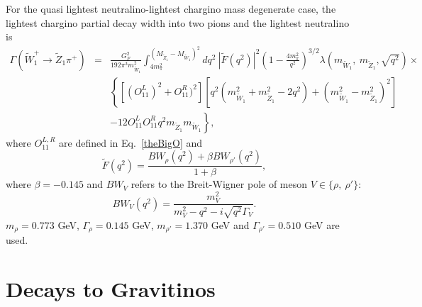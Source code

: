 \documentclass[final,3p,times]{elsarticle}
\begin{document}
For the quasi lightest neutralino-lightest chargino mass degenerate case, 
the lightest chargino partial decay width into two pions and the lightest
neutralino 
is~\cite{gunionetal} 
\begin{eqnarray}
\Gamma( {\tilde W}_1^+ \rightarrow {\tilde Z}_1 \pi^+) &=& 
\frac{G_F^2}{192 \pi^3 m_{{\tilde W}_1}^2} \int_{4 m_\pi^2}^{(M_{\tilde{Z}_1}-M_{\tilde{W}_1})^2}
dq^2\ \left| \tilde{F}(q^2)\right|^2 \left(1 - \frac{4 m_\pi^2}{q^2} \right)^{3/2}
\lambda\left(m_{\tilde{W}_1},\ m_{\tilde{Z}_1}, \sqrt{q^2}\right) \times \nonumber \\&&
\left\{ \left[ (O^L_{11})^2 +O^R_{11})^2\right] 
\left[ q^2(m_{{\tilde W}_1}^2 + m_{{\tilde Z}_1}^2-2q^2) +
(m_{{\tilde W}_1}^2 - m_{{\tilde Z}_1}^2)^2 \right] \right. \nonumber \\
&&\left. -12 O^L_{11} O^R_{11} q^2 m_{\tilde{Z}_1}m_{\tilde{W}_1}
\right\}, \label{chpipineut}
\end{eqnarray}
where $O^{L,R}_{11}$ are defined in Eq.~\ref{theBigO} and
\begin{equation}
\tilde{F}(q^2)=\frac{BW_\rho(q^2) + \beta BW_{\rho'}(q^2)}{1+\beta},
\end{equation}
where $\beta=-0.145$ and
$BW_V$ refers to the Breit-Wigner pole of meson $V \in \{ \rho,\ \rho' \}$:
\begin{equation}
BW_V(q^2) = \frac{m_V^2}{m_V^2 - q^2 - i \sqrt{q^2} \Gamma_V}.
\end{equation}
$m_\rho=0.773$ GeV, $\Gamma_\rho=0.145$ GeV, $m_{\rho'}=1.370$ GeV and
$\Gamma_{\rho'}=0.510$ GeV are used. 
\section{Decays to Gravitinos} \label{appendix:gravitinos}
\end{document}
